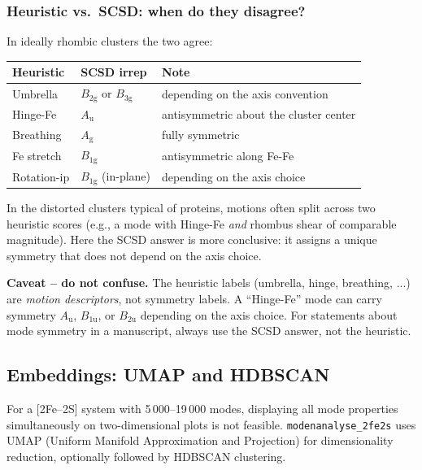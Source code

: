 \documentclass[11pt,a4paper,twoside]{article}
\newcommand{\Ag}{A_{\mathrm{g}}}
\newcommand{\Bgi}[1]{B_{\mathrm{#1g}}}
\newcommand{\Bui}[1]{B_{\mathrm{#1u}}}
\newcommand{\Aui}{A_{\mathrm{u}}}
\theoremstyle{remark}
\begin{document}
\subsubsection*{Heuristic vs.\ SCSD: when do they disagree?}

In ideally rhombic clusters the two agree:

\begin{center}
\begin{tabularx}{\textwidth}{l l X}
\toprule
\textbf{Heuristic} & \textbf{SCSD irrep} & \textbf{Note} \\
\midrule
Umbrella     & $\Bgi{2}$ or $\Bgi{3}$ & depending on the axis convention \\
Hinge-Fe     & $\Aui$           & antisymmetric about the cluster center \\
Breathing    & $\Ag$            & fully symmetric \\
Fe stretch   & $\Bgi{1}$        & antisymmetric along Fe-Fe \\
Rotation-ip  & $\Bgi{1}$ (in-plane) & depending on the axis choice \\
\bottomrule
\end{tabularx}
\end{center}

In the distorted clusters typical of proteins, motions often split
across two heuristic scores (e.g., a mode with Hinge-Fe \emph{and}
rhombus shear of comparable magnitude). Here the SCSD answer is
more conclusive: it assigns a unique symmetry that does not depend
on the axis choice.

\begin{warnbox}
\textbf{Caveat -- do not confuse.} The heuristic labels (umbrella,
hinge, breathing, ...) are \emph{motion descriptors}, not symmetry
labels. A ``Hinge-Fe'' mode can carry symmetry $\Aui$, $\Bui{1}$,
or $\Bui{2}$ depending on the axis choice. For statements about
mode symmetry in a manuscript, always use the SCSD answer, not the
heuristic.
\end{warnbox}

\subsection{Embeddings: UMAP and HDBSCAN}
\label{sec:embeddings}

For a [2Fe--2S] system with 5\,000--19\,000 modes, displaying all
mode properties simultaneously on two-dimensional plots is not
feasible. \texttt{modenanalyse\_2fe2s} uses UMAP (Uniform Manifold
Approximation and Projection) for dimensionality reduction,
optionally followed by HDBSCAN clustering.
\end{document}
